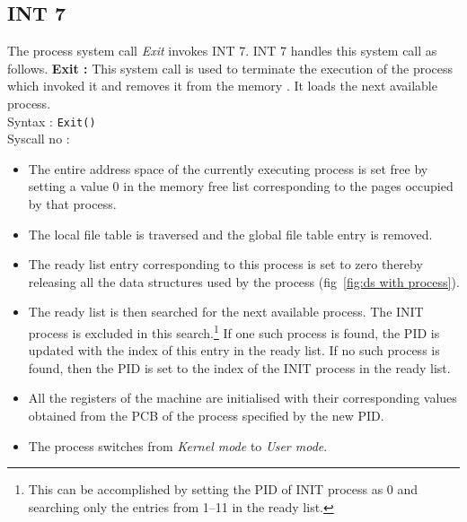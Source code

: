 \documentclass[11pt]{report}
\newcommand\counter[1]{\arabic{#1} \stepcounter{#1}}
\newcounter{syscall}
\begin{document}
\subsection{INT 7}
The process system call \textit{Exit} invokes INT 7. INT 7 handles this system call as follows.
\textbf{Exit :}  This system call is used to terminate the execution of the process which invoked it and removes it from the memory . It loads the next available process.\\
Syntax :  \texttt{Exit()}  \\
Syscall no : \counter{syscall}
\begin{itemize}
	\item The entire address space of the currently executing process is set free by setting a value 0 in the memory free list corresponding to the pages occupied by that process.
	
	\item The local file table is traversed and the global file table entry is removed.
	
	\item The ready list entry corresponding to this process is set to zero thereby releasing all the data structures used by the process (fig~\ref{fig:ds with process}).
	
	\item The ready list is then searched for the next available process. The INIT process is excluded in this search.\footnote{This can be accomplished by setting the PID of INIT process as 0 and searching only the entries from 1--11 in the ready list.} If one such process is found, the PID is updated with the index of this entry in the ready list. If no such process is found, then the PID is set to the index of the INIT process in the ready list.
	
	\item All the registers of the machine are initialised with their corresponding values obtained from the PCB of the process specified by the new PID.
	
	\item The process switches from \textit{Kernel mode} to \textit{User mode}.
\end{itemize}
\end{document}
